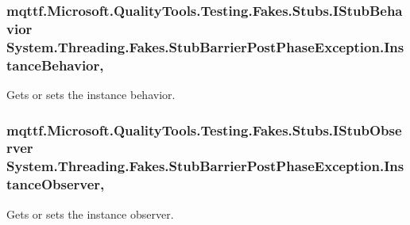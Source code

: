 \hypertarget{class_system_1_1_threading_1_1_fakes_1_1_stub_barrier_post_phase_exception_a55dd5b7218de77de31463ad508780cec}{
\subsubsection[{Instance\-Behavior}]{\setlength{\rightskip}{0pt plus 5cm}mqttf.\-Microsoft.\-Quality\-Tools.\-Testing.\-Fakes.\-Stubs.\-I\-Stub\-Behavior System.\-Threading.\-Fakes.\-Stub\-Barrier\-Post\-Phase\-Exception.\-Instance\-Behavior\hspace{0.3cm}{\ttfamily [get]}, {\ttfamily [set]}}}\label{class_system_1_1_threading_1_1_fakes_1_1_stub_barrier_post_phase_exception_a55dd5b7218de77de31463ad508780cec}


Gets or sets the instance behavior.

\hypertarget{class_system_1_1_threading_1_1_fakes_1_1_stub_barrier_post_phase_exception_addacbd9c3ebfd3cffa79685f2472a903}{
\subsubsection[{Instance\-Observer}]{\setlength{\rightskip}{0pt plus 5cm}mqttf.\-Microsoft.\-Quality\-Tools.\-Testing.\-Fakes.\-Stubs.\-I\-Stub\-Observer System.\-Threading.\-Fakes.\-Stub\-Barrier\-Post\-Phase\-Exception.\-Instance\-Observer\hspace{0.3cm}{\ttfamily [get]}, {\ttfamily [set]}}}\label{class_system_1_1_threading_1_1_fakes_1_1_stub_barrier_post_phase_exception_addacbd9c3ebfd3cffa79685f2472a903}


Gets or sets the instance observer.

